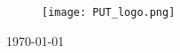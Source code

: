 \begin{titlepage}

\begin{figure}[h]
\centering
\texttt{[image: PUT\_logo.png]}\\[1cm] %
\end{figure}


{\large \today}\\[1cm] %



\vfill %

\end{titlepage}
